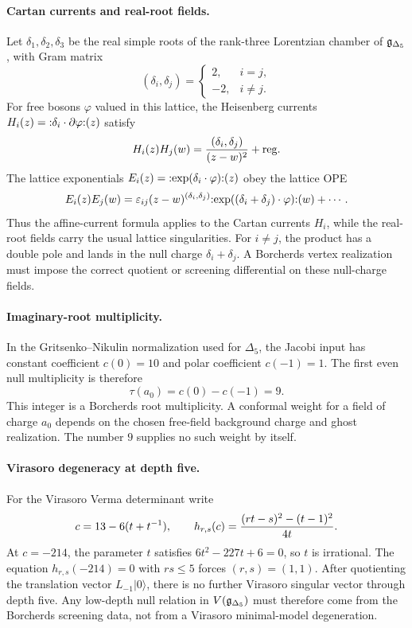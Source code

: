 \paragraph{Cartan currents and real-root fields.}
Let $\delta_1,\delta_2,\delta_3$ be the real simple roots of the
rank-three Lorentzian chamber of $\mathfrak{g}_{\Delta_5}$, with Gram matrix
\[
  (\delta_i,\delta_j)=
  \begin{cases}
  2, & i=j,\\
  -2, & i\ne j.
  \end{cases}
\]
For free bosons $\varphi$ valued in this lattice, the Heisenberg
currents $H_i(z)=\mathopen{:}{\delta_i\cdot\partial\varphi}\mathclose{:}(z)$ satisfy
\begin{equation}
\label{wn:eq:delta5-Heisenberg-ope}
H_i(z)H_j(w)
 =
 {(\delta_i,\delta_j)\over (z-w)^2}
 + \mathrm{reg}.
\end{equation}
The lattice exponentials
$E_i(z)=\mathopen{:}{\exp(\delta_i\cdot\varphi)}\mathclose{:}(z)$ obey the lattice OPE
\begin{equation}
\label{wn:eq:delta5-lattice-exp-ope}
E_i(z)E_j(w)
 =
 \varepsilon_{ij}(z-w)^{(\delta_i,\delta_j)}
 \mathopen{:}{\exp((\delta_i+\delta_j)\cdot\varphi)}\mathclose{:}(w)
 + \cdots .
\end{equation}
Thus the affine-current formula applies to the Cartan currents
$H_i$, while the real-root fields carry the usual lattice singularities.
For $i\ne j$, the product has a double pole and lands in the null
charge $\delta_i+\delta_j$. A Borcherds vertex realization must impose
the correct quotient or screening differential on these null-charge
fields.

\paragraph{Imaginary-root multiplicity.}
In the Gritsenko--Nikulin normalization used for $\Delta_5$, the Jacobi
input has constant coefficient $c(0)=10$ and polar coefficient
$c(-1)=1$. The first even null multiplicity is therefore
\[
  \tau(a_0)=c(0)-c(-1)=9 .
\]
This integer is a Borcherds root multiplicity. A conformal weight for a
field of charge $a_0$ depends on the chosen free-field background charge
and ghost realization. The number $9$ supplies no such weight by itself.

\paragraph{Virasoro degeneracy at depth five.}
For the Virasoro Verma determinant write
\[
  c=13-6(t+t^{-1}),\qquad
  h_{r,s}(c)=
  { (rt-s)^2-(t-1)^2 \over 4t } .
\]
At $c=-214$, the parameter $t$ satisfies
$6t^2-227t+6=0$, so $t$ is irrational. The equation
$h_{r,s}(-214)=0$ with $rs\le 5$ forces $(r,s)=(1,1)$.
After quotienting the translation vector $L_{-1}|0\rangle$, there is
no further Virasoro singular vector through depth five. Any low-depth
null relation in $V(\mathfrak{g}_{\Delta_5})$ must therefore come from the Borcherds
screening data, not from a Virasoro minimal-model degeneration.


